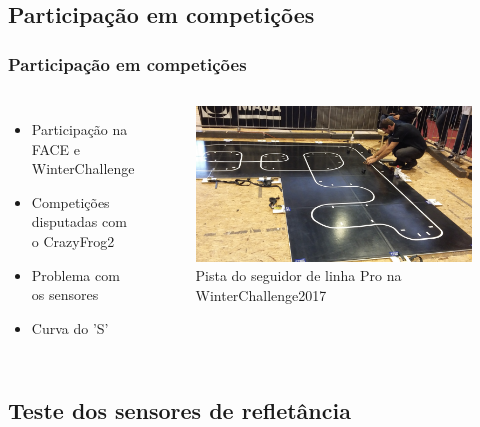 \subsection{Participação em competições}

\begin{frame}
\frametitle{Participação em competições}
\begin{columns}

	\begin{itemize}
		\item Participação na FACE e WinterChallenge
		\item Competições disputadas com o CrazyFrog2
		\item Problema com os sensores
		\item Curva do 'S'
	\end{itemize}		
	
	
	\begin{figure}[th]
	\centering
	\captionsetup{width=\textwidth,font=footnotesize,textfont=bf}
	\includegraphics[width=\textwidth,keepaspectratio]{Figuras/winter.jpg}
	\caption{Pista do seguidor de linha Pro na WinterChallenge2017}
	\end{figure}
	
\end{columns}
\end{frame}


\subsection{Teste dos sensores de refletância}

